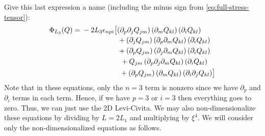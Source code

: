 \documentclass[reqno]{article}
\begin{document}
Give this last expression a name (including the minus sign from \eqref{eq:full-stress-tensor}):
\begin{equation}
	\Phi_{L_3}(Q)
	= 
	\begin{multlined}[t]
	-2 L_3 \epsilon_{npi} \bigl[ 
	\left( \partial_p \partial_j Q_{jm} \right) \left( \partial_m Q_{kl} \right) \left( \partial_i Q_{kl} \right) \\
	\hspace{1.5cm}+ \left( \partial_j Q_{jm} \right) \left( \partial_p \partial_m Q_{kl} \right) \left( \partial_i Q_{kl} \right) \\
	\hspace{1.5cm}+ \left( \partial_p Q_{jm} \right) \left( \partial_j \partial_m Q_{kl} \right) \left( \partial_i Q_{kl} \right) \\
	\hspace{1.5cm}+ Q_{jm} \left( \partial_p \partial_j \partial_m Q_{kl} \right) \left( \partial_i Q_{kl} \right) \\
	\hspace{1.5cm}+ \left( \partial_p Q_{jm} \right) \left( \partial_m Q_{kl} \right) \left( \partial_i \partial_j Q_{kl} \right)
	\bigr]
	\end{multlined}
\end{equation}
Note that in these equations, only the $n = 3$ term is nonzero since we have $\partial_p$ and $\partial_i$ terms in each term.
Hence, if we have $p = 3$ or $i = 3$ then everything goes to zero. 
Thus, we can just use the 2D Levi-Civita. 
We may also non-dimensionalize these equations by dividing by $L = 2 L_1$ and multiplying by $\xi^4$. We will consider only the non-dimensionalized equations as follows.
\end{document}
